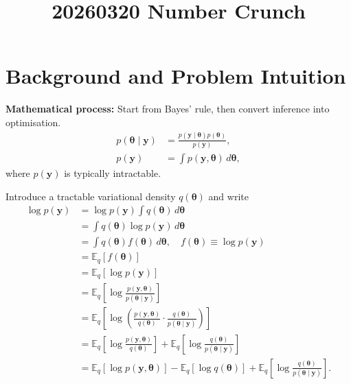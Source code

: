 \documentclass[11pt]{article}
\title{20260320 Number Crunch}
\author{}
\date{}
\newcommand{\E}{\mathbb{E}}
\begin{document}
\maketitle

\section*{Background and Problem Intuition}

\textbf{Mathematical process:} Start from Bayes' rule, then convert inference into optimisation.
\begin{align}
p(\bm\theta\mid\bm y)
&= \frac{p(\bm y\mid\bm\theta)p(\bm\theta)}{p(\bm y)}, \\
p(\bm y)
&= \int p(\bm y,\bm\theta)\,d\bm\theta,
\end{align}
where $p(\bm y)$ is typically intractable.

Introduce a tractable variational density $q(\bm\theta)$ and write
\begin{align}
\log p(\bm y)
&= \log p(\bm y)\int q(\bm\theta)\,d\bm\theta \\
&= \int q(\bm\theta)\log p(\bm y)\,d\bm\theta \\
&= \int q(\bm\theta)f(\bm\theta)\,d\bm\theta,
\quad f(\bm\theta)\equiv \log p(\bm y) \\
&= \E_q\!\left[f(\bm\theta)\right] \\
&= \E_q\!\left[\log p(\bm y)\right] \\
&= \E_q\!\left[\log \frac{p(\bm y,\bm\theta)}{p(\bm\theta\mid\bm y)}\right] \\
&= \E_q\!\left[\log \left(\frac{p(\bm y,\bm\theta)}{q(\bm\theta)}\cdot
\frac{q(\bm\theta)}{p(\bm\theta\mid\bm y)}\right)\right] \\
&= \E_q\!\left[\log \frac{p(\bm y,\bm\theta)}{q(\bm\theta)}\right]
 +\E_q\!\left[\log \frac{q(\bm\theta)}{p(\bm\theta\mid\bm y)}\right] \\
&= \E_q[\log p(\bm y,\bm\theta)]-\E_q[\log q(\bm\theta)]
 +\E_q\!\left[\log \frac{q(\bm\theta)}{p(\bm\theta\mid\bm y)}\right].
\end{align}
\end{document}
